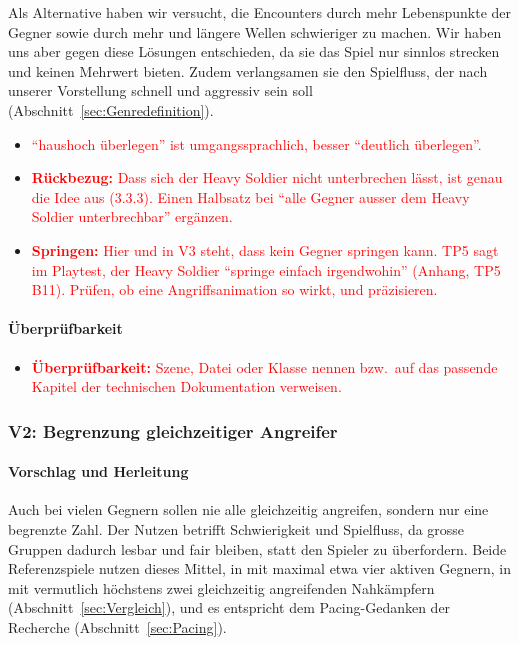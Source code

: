 \documentclass[../Main.tex]{subfiles}
\begin{document}
Als Alternative haben wir versucht, die Encounters durch mehr Lebenspunkte der Gegner sowie durch mehr und längere Wellen schwieriger zu machen. Wir haben uns aber gegen diese Lösungen entschieden, da sie das Spiel nur sinnlos strecken und keinen Mehrwert bieten. Zudem verlangsamen sie den Spielfluss, der nach unserer Vorstellung schnell und aggressiv sein soll (Abschnitt~\ref{sec:Genredefinition}).

\begin{itemize}[leftmargin=1.5cm]
    \item \textcolor{red}{\enquote{haushoch überlegen} ist umgangssprachlich, besser \enquote{deutlich überlegen}.}
    \item \textcolor{red}{\textbf{Rückbezug:} Dass sich der Heavy Soldier nicht unterbrechen lässt, ist genau die Idee aus  (3.3.3). Einen Halbsatz bei \enquote{alle Gegner ausser dem Heavy Soldier unterbrechbar} ergänzen.}
    \item \textcolor{red}{\textbf{Springen:} Hier und in V3 steht, dass kein Gegner springen kann. TP5 sagt im Playtest, der Heavy Soldier \enquote{springe einfach irgendwohin} (Anhang, TP5 B11). Prüfen, ob eine Angriffsanimation so wirkt, und präzisieren.}
\end{itemize}

\paragraph{Überprüfbarkeit}
\begin{itemize}[leftmargin=1.5cm]
    \item \textcolor{red}{\textbf{Überprüfbarkeit:} Szene, Datei oder Klasse nennen bzw.\ auf das passende Kapitel der technischen Dokumentation verweisen.}
\end{itemize}

\subsubsection{V2: Begrenzung gleichzeitiger Angreifer} \label{sec:V2}

\paragraph{Vorschlag und Herleitung}
Auch bei vielen Gegnern sollen nie alle gleichzeitig angreifen, sondern nur eine begrenzte Zahl. Der Nutzen betrifft Schwierigkeit und Spielfluss, da grosse Gruppen dadurch lesbar und fair bleiben, statt den Spieler zu überfordern. Beide Referenzspiele nutzen dieses Mittel, in  mit maximal etwa vier aktiven Gegnern, in  mit vermutlich höchstens zwei gleichzeitig angreifenden Nahkämpfern (Abschnitt~\ref{sec:Vergleich}), und es entspricht dem Pacing-Gedanken der Recherche (Abschnitt~\ref{sec:Pacing}).
\end{document}
